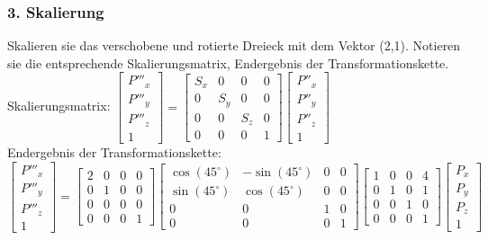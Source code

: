 \documentclass[11pt, a4paper]{article} %
\begin{document}
\newpage
\subsubsection*{3. Skalierung}
Skalieren sie das verschobene und rotierte Dreieck mit dem Vektor (2,1). Notieren sie die entsprechende Skalierungsmatrix, Endergebnis der Transformationskette. \\[0.1cm]
Skalierungsmatrix: $\begin{bmatrix}
	P'''_x \\ P'''_y \\ P'''_z \\ 1
\end{bmatrix} = \begin{bmatrix}
	S_x & 0 & 0 & 0 \\ 0 & S_y & 0 & 0 \\ 0 & 0 & S_z & 0 \\ 0 & 0 & 0 & 1
\end{bmatrix} \begin{bmatrix}
	P''_x \\ P''_y \\ P''_z \\ 1
\end{bmatrix}$ \\
Endergebnis der Transformationskette: $\begin{bmatrix}
	P'''_x \\ P'''_y \\ P'''_z \\ 1
\end{bmatrix} = \begin{bmatrix}
2 & 0 & 0 & 0 \\ 0 & 1 & 0 & 0 \\ 0 & 0 & 0 & 0 \\ 0 & 0 & 0 & 1
\end{bmatrix} \begin{bmatrix}
	\cos(45^\circ) & -\sin(45^\circ) & 0 & 0 \\ \sin(45^\circ) & \cos(45^\circ) & 0 & 0 \\ 0 & 0 & 1 & 0 \\ 0 & 0 & 0 & 1
\end{bmatrix} \begin{bmatrix}
	1 & 0 & 0 & 4 \\ 0 & 1 & 0 & 1 \\ 0 & 0 & 1 & 0 \\ 0 & 0 & 0 & 1
\end{bmatrix} \begin{bmatrix}
	P_x \\ P_y \\ P_z \\ 1
\end{bmatrix}$ \\
\end{document}
